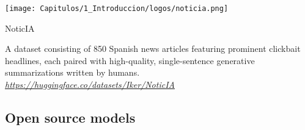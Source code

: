 \begin{resources}
    {
    \begin{adjustbox}{valign=c}
    \texttt{[image: Capitulos/1\_Introduccion/logos/noticia.png]}
    \end{adjustbox}
    \begin{adjustbox}{valign=c}
    \begin{minipage}{\textwidth}
    NoticIA
    \end{minipage}
    \end{adjustbox}
    }
    A dataset consisting of 850 Spanish news articles featuring prominent clickbait headlines, each paired with high-quality, single-sentence generative summarizations written by humans.  \\
    \textit{\href{https://huggingface.co/datasets/Iker/NoticIA}{https://huggingface.co/datasets/Iker/NoticIA}}
\end{resources}


\subsection{Open source models}


